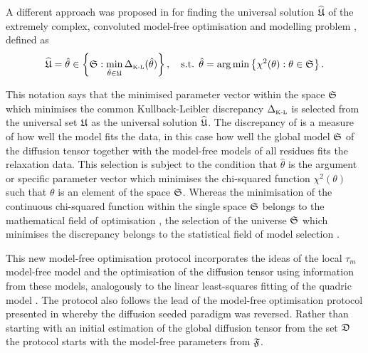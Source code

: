 A different approach was proposed in \citet{dAuvergneGooley08b} for finding the universal solution $\widehat{\mathfrak{U}}$ of the extremely complex, convoluted model-free optimisation and modelling problem \citep{dAuvergneGooley07}, defined as
\begin{equation} \label{eq: universal solution}
 \widehat{\mathfrak{U}} = \hat\theta \in \left\{ \mathfrak{S}: \min_{\hat\theta \in \mathfrak{U}} \Delta_{\scriptscriptstyle \text{K-L}}(\hat\theta) \right\},
  \text{\quad s.t. }
  \hat\theta = \arg \min \left\{\chi^2(\theta): \theta \in \mathfrak{S} \right\}.
\end{equation}

\noindent This notation says that the minimised parameter vector within the space $\mathfrak{S}$ which minimises the common Kullback-Leibler discrepancy $\Delta_{\scriptscriptstyle \text{K-L}}$ is selected from the universal set $\mathfrak{U}$ as the universal solution $\widehat{\mathfrak{U}}$.
The discrepancy of \citet{KullbackLeibler51} is a measure of how well the model fits the data, in this case how well the global model $\mathfrak{S}$ of the diffusion tensor together with the model-free models of all residues fits the relaxation data.
This selection is subject to the condition that $\hat\theta$ is the argument or specific parameter vector which minimises the chi-squared function $\chi^2(\theta)$ such that $\theta$ is an element of the space $\mathfrak{S}$.
Whereas the minimisation of the continuous chi-squared function within the single space $\mathfrak{S}$ belongs to the mathematical field of optimisation \citep{NocedalWright99}, the selection of the universe $\mathfrak{S}$ which minimises the discrepancy belongs to the statistical field of model selection \citep{Akaike73,Schwarz78,LinhartZucchini86,Zucchini00,dAuvergneGooley03}.

This new model-free optimisation protocol incorporates the ideas of the local $\tau_m$ model-free model \citep{Barbato92, Schurr94} and the optimisation of the diffusion tensor using information from these models, analogously to the linear least-squares fitting of the quadric model \citep{Bruschweiler95, Lee97}.
The protocol also follows the lead of the model-free optimisation protocol presented in \citet{Butterwick04} whereby the diffusion seeded paradigm was reversed.
Rather than starting with an initial estimation of the global diffusion tensor from the set $\mathfrak{D}$ the protocol starts with the model-free parameters from $\mathfrak{F}$.

